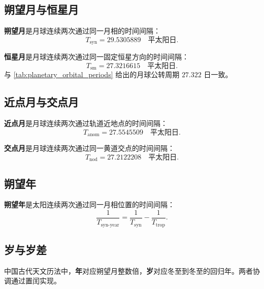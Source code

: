 \subsection{朔望月与恒星月}

\begin{definition}[朔望月]\label{def:synodic_month}
\textbf{朔望月}是月球连续两次通过同一月相的时间间隔：
\[
T_{\text{syn}}=29.5305889\quad\text{平太阳日}.
\]
\end{definition}

\begin{definition}[恒星月]\label{def:sidereal_month}
\textbf{恒星月}是月球连续两次通过同一固定恒星方向的时间间隔：
\[
T_{\text{sm}}=27.3216615\quad\text{平太阳日}.
\]
与 \cref{tab:planetary_orbital_periods} 给出的月球公转周期 $27.322$ 日一致。
\end{definition}

\subsection{近点月与交点月}

\begin{definition}[近点月]\label{def:anomalistic_month}
\textbf{近点月}是月球连续两次通过轨道近地点的时间间隔：
\[
T_{\text{anom}}=27.5545509\quad\text{平太阳日}.
\]
\end{definition}

\begin{definition}[交点月]\label{def:nodal_month}
\textbf{交点月}是月球连续两次通过同一黄道交点的时间间隔：
\[
T_{\text{nod}}=27.2122208\quad\text{平太阳日}.
\]
\end{definition}

\subsection{朔望年}

\begin{definition}[朔望年]\label{def:synodic_year}
\textbf{朔望年}是太阳连续两次通过同一月相位置的时间间隔：
\[
\frac1{T_{\text{syn-year}}}=\frac1{T_{\text{syn}}}-\frac1{T_{\text{trop}}}.
\]
\end{definition}

\subsection{岁与岁差}

\begin{definition}[岁]\label{def:sui}
中国古代天文历法中，\textbf{年}对应朔望月整数倍，\textbf{岁}对应冬至到冬至的回归年。两者协调通过置闰实现。
\end{definition}

